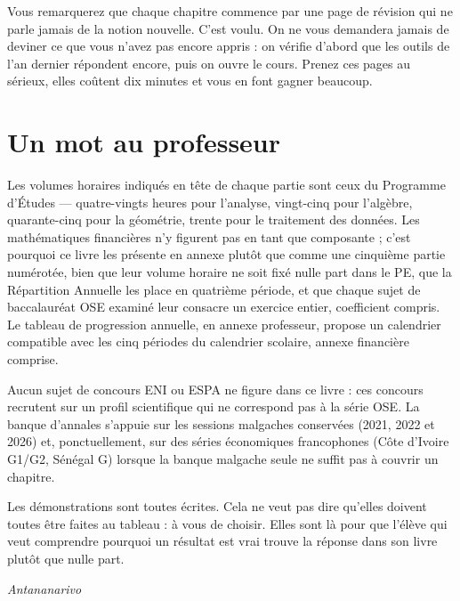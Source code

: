 Vous remarquerez que chaque chapitre commence par une page de révision qui ne
parle jamais de la notion nouvelle. C'est voulu. On ne vous demandera jamais
de deviner ce que vous n'avez pas encore appris : on vérifie d'abord que les
outils de l'an dernier répondent encore, puis on ouvre le cours. Prenez ces
pages au sérieux, elles coûtent dix minutes et vous en font gagner beaucoup.

\section*{Un mot au professeur}

Les volumes horaires indiqués en tête de chaque partie sont ceux du Programme
d'Études — quatre-vingts heures pour l'analyse, vingt-cinq pour l'algèbre,
quarante-cinq pour la géométrie, trente pour le traitement des données. Les
mathématiques financières n'y figurent pas en tant que composante ; c'est
pourquoi ce livre les présente en annexe plutôt que comme une cinquième
partie numérotée, bien que leur volume horaire ne soit fixé nulle part dans
le PE, que la Répartition Annuelle les place en quatrième période, et que
chaque sujet de baccalauréat OSE examiné leur consacre un exercice entier,
coefficient compris. Le tableau de progression annuelle, en annexe
professeur, propose un calendrier compatible avec les cinq périodes du
calendrier scolaire, annexe financière comprise.

Aucun sujet de concours ENI ou ESPA ne figure dans ce livre : ces concours
recrutent sur un profil scientifique qui ne correspond pas à la série OSE.
La banque d'annales s'appuie sur les sessions malgaches conservées (2021,
2022 et 2026) et, ponctuellement, sur des séries économiques francophones
(Côte d'Ivoire G1/G2, Sénégal G) lorsque la banque malgache seule ne suffit
pas à couvrir un chapitre.

Les démonstrations sont toutes écrites. Cela ne veut pas dire qu'elles
doivent toutes être faites au tableau : à vous de choisir. Elles sont là pour
que l'élève qui veut comprendre pourquoi un résultat est vrai trouve la
réponse dans son livre plutôt que nulle part.

\vspace{1.2em}
\noindent\textit{Antananarivo}
